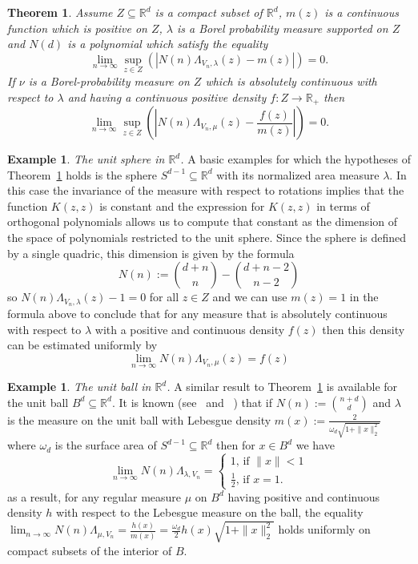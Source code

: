 \documentclass[12pt]{amsart}
\newtheorem{theorem}[lemma]{Theorem}
\theoremstyle{definition}
\newtheorem{examplex}[lemma]{Example}
\newcommand{\RR}{\ensuremath{\mathbb{R}}}
\begin{document}
\begin{theorem}\label{CD_Density_estimation} Assume $Z\subseteq\RR^d$ is a compact subset of $\RR^d$, $m(z)$ is a continuous function which is positive on $Z$, $\lambda$ is a Borel probability measure supported on $Z$ and $N(d)$ is a polynomial which satisfy the equality 
\[\lim_{n\rightarrow \infty} \sup_{z\in Z}\left(|N(n)\Lambda_{V_n,\lambda}(z)-m(z)|\right)=0.\]
If $\nu$ is a Borel-probability measure on $Z$ which is absolutely continuous with respect to $\lambda$ and having a continuous positive density $f:Z\rightarrow \RR_{+}$ then 
\[\lim_{n\rightarrow \infty} \sup_{z\in Z}\left(\left|N(n)\Lambda_{V_n,\mu}(z)-\frac{f(z)}{m(z)}\right|\right)=0.\]
\end{theorem}

\begin{examplex}\label{ex: unit_sphere}{\it The unit sphere in $\RR^d$.}
A basic examples for which the hypotheses of Theorem~\ref{CD_Density_estimation} holds is the sphere $S^{d-1}\subseteq \RR^d$ with its normalized area measure $\lambda$. In this case the invariance of the measure with respect to rotations implies that the function $K(z,z)$ is constant and the expression for $K(z,z)$ in terms of orthogonal polynomials allows us to compute that constant as the dimension of the space of polynomials restricted to the unit sphere. Since the sphere is defined by a single quadric, this dimension is given by the formula
\[N(n) := \binom{d+n}{n}-\binom{d+n-2}{n-2}\]
so $N(n)\Lambda_{V_n,\lambda}(z)-1=0$ for all $z\in Z$ and we can use $m(z)=1$ in the formula above to conclude that for any measure that is absolutely continuous with respect to $\lambda$ with a positive and continuous density $f(z)$ then this density can be estimated uniformly by
\[\lim_{n\rightarrow \infty} N(n)\Lambda_{V_n,\mu}(z)=f(z)\]
\end{examplex}


\begin{examplex}\label{ex: unit_ball} {\it The unit ball in $\RR^d$.} A similar result to Theorem~\ref{CD_Density_estimation} is available for the unit ball $B^{d}\subseteq \RR^d$. It is known (see~\cite[Lemma 4.2.1, Theorem 4.2.2]{LPPBook} and ~\cite[Theorem 1.3]{KrooLubitsky2013a}) that if $N(n):=\binom{n+d}{d}$ and $\lambda$ is the measure on the unit ball with Lebesgue density $m(x):=\frac{2}{\omega_d\sqrt{1+\|x\|_2^2}}$ where $\omega_d$ is the surface area of $S^{d-1}\subseteq \RR^d$ then for $x\in B^d$ we have
\[\lim_{n\rightarrow \infty} N(n)\Lambda_{\lambda, V_n}=
\begin{cases}
1\text{, if $\|x\|<1$}\\
\frac{1}{2} \text{, if $x=1$.}
\end{cases}
\]
as a result, for any regular measure $\mu$ on $B^d$ having positive and continuous density $h$ with respect to the Lebesgue measure on the ball, the equality $\lim_{n\rightarrow\infty}N(n)\Lambda_{\mu, V_n} = \frac{h(x)}{m(x)}= \frac{\omega_d}{2}h(x)\sqrt{1+\|x\|_2^2}$ holds uniformly on compact subsets of the interior of $B$.

\end{examplex}
\end{document}
